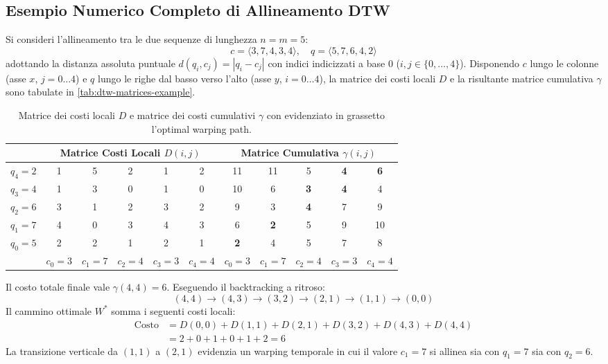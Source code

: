 \FloatBarrier
\subsection{Esempio Numerico Completo di Allineamento DTW}
\label{subsec:ts-dtw-example-walkthrough}

Si consideri l'allineamento tra le due sequenze di lunghezza $n=m=5$:
\begin{equation*}
c = \langle 3, 7, 4, 3, 4 \rangle, \quad q = \langle 5, 7, 6, 4, 2 \rangle
\end{equation*}
adottando la distanza assoluta puntuale $d(q_i, c_j) = |q_i - c_j|$ con indici indicizzati a base 0 ($i, j \in \{0, \dots, 4\}$). Disponendo $c$ lungo le colonne (asse $x$, $j=0 \dots 4$) e $q$ lungo le righe dal basso verso l'alto (asse $y$, $i=0 \dots 4$), la matrice dei costi locali $D$ e la risultante matrice cumulativa $\gamma$ sono tabulate in \autoref{tab:dtw-matrices-example}.

\begin{table}[H]
\centering
\scriptsize
\setlength{\tabcolsep}{3.5pt}
\renewcommand{\arraystretch}{1.2}
\begin{tabular}{c | c c c c c | c c c c c}
\toprule
& \multicolumn{5}{c|}{\textbf{Matrice Costi Locali $D(i,j)$}} & \multicolumn{5}{c}{\textbf{Matrice Cumulativa $\gamma(i,j)$}} \\
\midrule
$q_4=2$ & 1 & 5 & 2 & 1 & 2 & 11 & 11 & 5 & \textbf{4} & \textbf{6} \\
$q_3=4$ & 1 & 3 & 0 & 1 & 0 & 10 & 6 & \textbf{3} & \textbf{4} & 4 \\
$q_2=6$ & 3 & 1 & 2 & 3 & 2 & 9 & 3 & \textbf{4} & 7 & 9 \\
$q_1=7$ & 4 & 0 & 3 & 4 & 3 & 6 & \textbf{2} & 5 & 9 & 10 \\
$q_0=5$ & 2 & 2 & 1 & 2 & 1 & \textbf{2} & 4 & 5 & 7 & 8 \\
\midrule
& $c_0=3$ & $c_1=7$ & $c_2=4$ & $c_3=3$ & $c_4=4$ & $c_0=3$ & $c_1=7$ & $c_2=4$ & $c_3=3$ & $c_4=4$ \\
\bottomrule
\end{tabular}
\caption{Matrice dei costi locali $D$ e matrice dei costi cumulativi $\gamma$ con evidenziato in grassetto l'optimal warping path.}
\label{tab:dtw-matrices-example}
\end{table}

Il costo totale finale vale $\gamma(4,4) = 6$. Eseguendo il backtracking a ritroso:
\begin{equation}
(4,4) \to (4,3) \to (3,2) \to (2,1) \to (1,1) \to (0,0)
\end{equation}
Il cammino ottimale $W^*$ somma i seguenti costi locali:
\begin{align*}
\text{Costo} &= D(0,0) + D(1,1) + D(2,1) + D(3,2) + D(4,3) + D(4,4) \\
&= 2 + 0 + 1 + 0 + 1 + 2 = 6
\end{align*}
La transizione verticale da $(1,1)$ a $(2,1)$ evidenzia un warping temporale in cui il valore $c_1=7$ si allinea sia con $q_1=7$ sia con $q_2=6$.

\FloatBarrier
